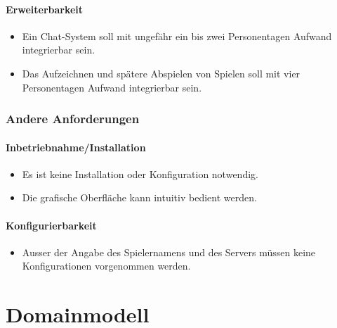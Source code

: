 \documentclass[12pt,halfparskip]{scrartcl}
\begin{document}
\paragraph{Erweiterbarkeit}\label{ssub:erweiterbarkeit} %

\begin{itemize}
	\item Ein Chat-System soll mit ungefähr ein bis zwei Personentagen Aufwand integrierbar sein.
	\item Das Aufzeichnen und spätere Abspielen von Spielen soll mit vier Personentagen Aufwand integrierbar sein.
\end{itemize}

\subsubsection{Andere Anforderungen}\label{ssub:andere_anforderungen} %
\paragraph{Inbetriebnahme/Installation}\label{ssub:inbetriebnahme_installation} %
\begin{itemize}
	\item Es ist keine Installation oder Konfiguration notwendig.
	\item Die grafische Oberfläche kann intuitiv bedient werden.
\end{itemize}
\paragraph{Konfigurierbarkeit}\label{ssub:konfigurierbarkeit} %
\begin{itemize}
	\item Ausser der Angabe des Spielernamens und des Servers müssen keine Konfigurationen vorgenommen werden.
\end{itemize}

\newpage

\section{Domainmodell}\label{cha:domainmodell} %
\end{document}
